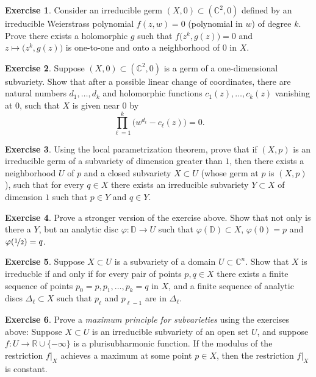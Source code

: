 \documentclass[12pt,openany]{book}
\newcommand{\C}{{\mathbb{C}}}
\newcommand{\R}{{\mathbb{R}}}
\newcommand{\D}{{\mathbb{D}}}
\theoremstyle{plain}
\theoremstyle{remark}
\theoremstyle{definition}
\newenvironment{exbox}{%
    \def\FrameCommand{\vrule width 1pt \relax\hspace{10pt}}%
    \MakeFramed{\advance\hsize-\width\FrameRestore}%
}{%
    \endMakeFramed
}
\theoremstyle{exercise}
\newtheorem{exercise}{Exercise}[section]
\theoremstyle{example}
\begin{document}
\begin{exbox}
\begin{exercise}
Consider an irreducible germ
$(X,0) \subset (\C^2,0)$ defined
by an irreducible Weierstrass polynomial $f(z,w) = 0$ (polynomial in $w$)
of degree $k$.  Prove there exists a holomorphic $g$ such that
$f\bigl(z^k,g(z)\bigr) = 0$ and $z \mapsto \bigl(z^k,g(z)\bigr)$
is one-to-one and onto a neighborhood of $0$ in $X$.
\end{exercise}

\begin{exercise}
Suppose $(X,0) \subset (\C^2,0)$ is a germ of a one-dimensional subvariety.
Show that after a possible linear change of coordinates,
there are natural numbers
$d_1,\ldots,d_k$
and
holomorphic functions $c_1(z),\ldots,c_k(z)$ vanishing at $0$,
such that $X$ is given near $0$ by
\begin{equation*}
\prod_{\ell=1}^k {\bigl( w^{d_\ell} - c_\ell(z) \bigr)} = 0.
\end{equation*}
\end{exercise}

\begin{exercise}
Using the local parametrization theorem, prove that
if $(X,p)$ is an irreducible germ of a subvariety of dimension greater
than $1$, then there exists a neighborhood $U$ of $p$ and a closed subvariety
$X \subset U$ (whose germ at $p$ is $(X,p)$), such that for every
$q \in X$ there exists an irreducible subvariety $Y \subset X$
of dimension $1$ such that $p \in Y$ and $q \in Y$.
\end{exercise}

\begin{exercise}
\pagebreak[2]
Prove a stronger version of the exercise above.  Show that not only is there
a $Y$, but an analytic disc $\varphi \colon \D \to U$ such that
$\varphi(\D) \subset X$, $\varphi(0) = p$ and $\varphi(\nicefrac{1}{2}) =
q$.
\end{exercise}

\begin{exercise}
Suppose $X \subset U$ is a subvariety of a domain $U \subset \C^n$.
Show that $X$ is irreducble
if and only if
for every pair of points $p,q \in X$ there exists a finite sequence
of points $p_0 = p, p_1, \ldots, p_k = q$ in $X$, and a finite sequence of analytic discs
$\Delta_\ell \subset X$ such that $p_{\ell}$ and $p_{\ell-1}$ are in
$\Delta_\ell$.
\end{exercise}

\begin{exercise}\label{exercise:maxprincsubvar}
Prove a \emph{maximum principle for subvarieties} using the exercises above:
Suppose $X \subset U$ is an irreducible subvariety of an open set $U$,
and suppose $f \colon U \to \R \cup \{ - \infty \}$
is a plurisubharmonic function.  If the modulus of the restriction $f|_X$
achieves a maximum
at some point $p \in X$, then the restriction $f|_X$ is constant.
\end{exercise}


\end{exbox}
\end{document}

